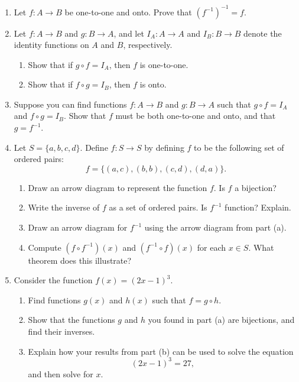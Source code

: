 \documentclass[letterpaper,12pt]{article}
\begin{document}
\begin{enumerate}
\item Let $f:A\to B$ be one-to-one and onto. Prove that $(f^{-1})^{-1}=f$.
\item Let $f:A\to B$ and $g:B\to A$, and let $I_A:A\to A$ and $I_B:B\to B$ denote the identity functions on $A$ and $B$, respectively.
\begin{enumerate}
 \item Show that if $g\circ f = I_A$, then $f$ is one-to-one.
 \item Show that if $f\circ g = I_B$, then $f$ is onto.
\end{enumerate}
\item Suppose you can find functions $f:A\to B$ and $g:B\to A$ such that $g\circ f = I_A$ and $f\circ g = I_B$. Show that $f$ must be both one-to-one and onto, and that $g=f^{-1}$.
\item Let $S=\{a,b,c,d\}$. Define $f:S\to S$ by defining $f$ to be the following set of ordered pairs:
\[
 f=\{(a,c),(b,b), (c,d), (d,a)\}.
\]
\begin{enumerate}
 \item Draw an arrow diagram to represent the function $f$. Is $f$ a bijection?
 \item Write the inverse of $f$ as a set of ordered pairs. Is $f^{-1}$ function? Explain.
 \item Draw an arrow diagram for $f^{-1}$ using the arrow diagram from part (a).
 \item Compute $(f\circ f^{-1})(x)$ and $(f^{-1}\circ f)(x)$ for each $x\in S$. What theorem does this illustrate?
\end{enumerate}
\item Consider the function $f(x)=(2x-1)^3$.
\begin{enumerate}
 \item Find functions $g(x)$ and $h(x)$ such that $f = g\circ h$.
 \item Show that the functions $g$ and $h$ you found in part (a) are bijections, and find their inverses.
 \item Explain how your results from part (b) can be used to solve the equation 
\[
 (2x-1)^3=27,
\]
 and then solve for $x$.
\end{enumerate}

\end{enumerate}
\end{document}

